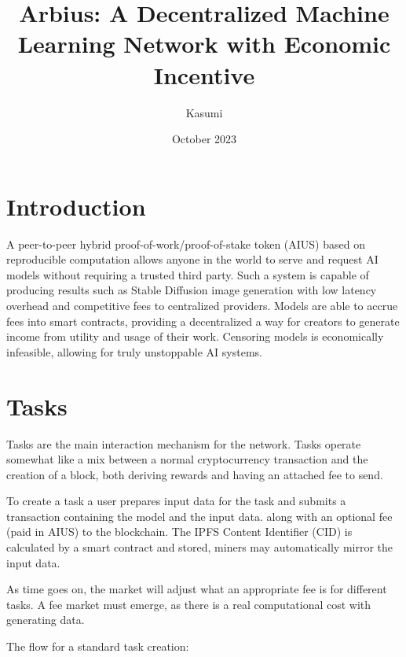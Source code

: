 \documentclass{article}
\title{Arbius: A Decentralized Machine Learning Network with Economic Incentive}
\author{Kasumi}
\date{October 2023}
\begin{document}
\maketitle

\section{Introduction}

A peer-to-peer hybrid proof-of-work/proof-of-stake token (AIUS) based on reproducible computation allows anyone in the world to serve and request AI models without requiring a trusted third party. Such a system is capable of producing results such as Stable Diffusion \cite{stablediffusion} image generation with low latency overhead and competitive fees to centralized providers. Models are able to accrue fees into smart contracts, providing a decentralized a way for creators to generate income from utility and usage of their work. Censoring models is economically infeasible, allowing for truly unstoppable AI systems.

\section{Tasks}

Tasks are the main interaction mechanism for the network. Tasks operate somewhat like a mix between a normal cryptocurrency transaction and the creation of a block, both deriving rewards and having an attached fee to send.

To create a task a user prepares input data for the task and submits a transaction containing the model and the input data. along with an optional fee (paid in AIUS) to the blockchain. The IPFS\cite{benet2014ipfs} Content Identifier (CID) is calculated by a smart contract and stored, miners may automatically mirror the input data.

As time goes on, the market will adjust what an appropriate fee is for different tasks. A fee market must emerge, as there is a real computational cost with generating data.


The flow for a standard task creation:
\end{document}
